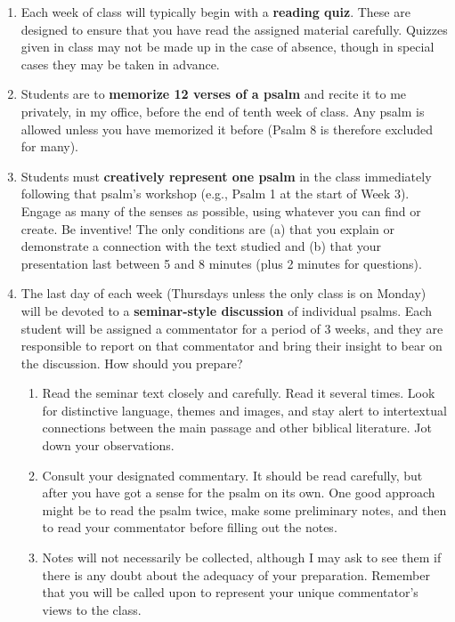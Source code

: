 \documentclass[titlepage]{article}
\begin{document}
\begin{enumerate}
 \item Each week of class will typically begin with a \textbf{reading
   quiz}. These are designed to ensure that you have read the assigned
   material carefully. Quizzes given in class may not be made up in the
   case of absence, though in special cases they may be taken in advance.
 \item Students are to \textbf{memorize 12 verses of a psalm} and recite
   it to me privately, in my office, before the end of tenth week of
   class. Any psalm is allowed unless you have memorized it before
   (Psalm 8 is therefore excluded for many).
 \item Students must \textbf{creatively represent one psalm} in the class
   immediately following that psalm’s workshop (e.g., Psalm 1 at the
   start of Week 3). Engage as many of the senses as possible, using
   whatever you can find or create. Be inventive! The only conditions
   are (a) that you explain or demonstrate a connection with the text
   studied and (b) that your presentation last between 5 and 8 minutes
   (plus 2 minutes for questions).
 \item The last day of each week (Thursdays unless the only class is on
   Monday) will be devoted to a \textbf{seminar-style discussion} of
   individual psalms. Each student will be assigned a commentator for a
   period of 3 weeks, and they are responsible to report on that
   commentator and bring their insight to bear on the discussion. How
   should you prepare?
	\begin{enumerate}
	 \item Read the seminar text closely and carefully. Read it several
       times. Look for distinctive language, themes and images, and stay
       alert to intertextual connections between the main passage and
       other biblical literature. Jot down your observations.
	 \item Consult your designated commentary. It should be read
       carefully, but after you have got a sense for the psalm on its
       own. One good approach might be to read the psalm twice, make
       some preliminary notes, and then to read your commentator before
       filling out the notes.
	 \item Notes will not necessarily be collected, although I may ask to
       see them if there is any doubt about the adequacy of your
       preparation. Remember that you will be called upon to represent
       your unique commentator’s views to the class.

\end{enumerate}
\end{enumerate}
\end{document}
